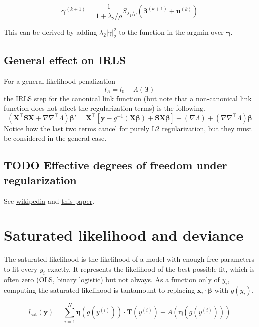\documentclass{article}
\newcommand{\bbeta}{\boldsymbol{\beta}}
\begin{document}
\[ \boldsymbol{\gamma}^{(k+1)} = \frac{1}{1 + \lambda_2/\rho} S_{\lambda_1/\rho}(\bbeta^{(k+1)} + \mathbf{u}^{(k)}) \]

This can be derived by adding \(\lambda_2|\gamma|_2^2\) to the function in
the argmin over \(\boldsymbol{\gamma}\).

\subsection{General effect on IRLS}

For a general likelihood penalization
\[ l_\Lambda = l_0 - \Lambda(\bbeta) \]
the IRLS step for the canonical link function (but note that a non-canonical
link function does not affect the regularization terms) is the following.
\begin{equation}
\left( \mathbf{X}^\intercal \mathbf{S} \mathbf{X} + \nabla \nabla^\intercal
\Lambda \right) \bbeta' = \mathbf{X}^\intercal \left[ \mathbf{y} -
g^{-1}(\mathbf{X}\bbeta) +
\mathbf{S} \mathbf{X} \bbeta \right] - (\nabla
\Lambda) + (\nabla \nabla^\intercal \Lambda) \bbeta
\end{equation}
Notice how the last two terms cancel for purely L2 regularization, but they must
be considered in the general case.

\subsection{TODO Effective degrees of freedom under regularization}

See
\href{https://en.wikipedia.org/wiki/Degrees_of_freedom_(statistics)#In_non-standard_regression}{wikipedia}
and \href{https://arxiv.org/abs/1311.2791}{this paper}.


\section{Saturated likelihood and deviance}

The saturated likelihood is the likelihood of a model with enough free
parameters to fit every \(y_i\) exactly. It represents the likelihood of the
best possible fit, which is often zero (OLS, binary logistic) but not always.
As a function only of \(y_i\), computing the saturated likelihood is
tantamount to replacing \(\mathbf{x}_i\cdot\bbeta\) with
\(g(y_i)\).

\[l_{\textrm{sat}}(\mathbf{y}) = \sum_{i=1}^N
\boldsymbol{\eta}(g(y^{(i)})) \cdot
\mathbf{T}(y^{(i)}) - A\left(\boldsymbol{\eta}(g(y^{(i)})) \right)\]
\end{document}
